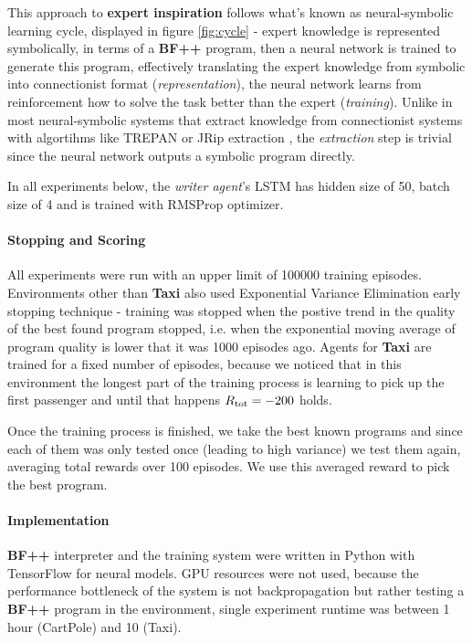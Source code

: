 This approach to \textbf{expert inspiration} follows what's known as neural-symbolic learning cycle, displayed in figure \ref{fig:cycle} - expert knowledge is represented symbolically, in terms of a \textbf{BF++} program, then a neural network is trained to generate this program, effectively translating the expert knowledge from symbolic into connectionist format (\emph{representation}), the neural network learns from reinforcement how to solve the task better than the expert (\emph{training}).
Unlike in most neural-symbolic systems \cite{neuralsymbolic} that extract knowledge from connectionist systems with algortihms like TREPAN \cite{trepan} or JRip extraction \cite{jripextr}, the \emph{extraction} step is trivial since the neural network outputs a symbolic program directly.

In all experiments below, the \emph{writer agent}'s LSTM has hidden size of 50, batch size of 4 and is trained with RMSProp \cite{tielemanLectureRmsPropDivide2012} optimizer.

\paragraph{Stopping and Scoring}

All experiments were run with an upper limit of 100000 training episodes.
Environments other than \textbf{Taxi} also used Exponential Variance Elimination \cite{evestop} early stopping technique - training was stopped when the postive trend in the quality of the best found program stopped, i.e. when the exponential moving average of program quality is lower that it was 1000 episodes ago.
Agents for \textbf{Taxi} are trained for a fixed number of episodes, because we noticed that in this environment the longest part of the training process is learning to pick up the first passenger and until that happens $R_\text{tot}=-200$ holds.

Once the training process is finished, we take the best known programs and since each of them was only tested once (leading to high variance) we test them again, averaging total rewards over 100 episodes. 
We use this averaged reward to pick the best program.

\paragraph{Implementation}

\textbf{BF++} interpreter and the training system were written in Python with TensorFlow for neural models.
GPU resources were not used, because the performance bottleneck of the system is not backpropagation but rather testing a \textbf{BF++} program in the environment, single experiment runtime was between 1 hour (CartPole) and 10 (Taxi).


